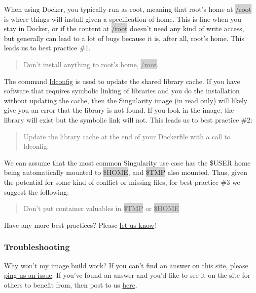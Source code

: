\documentclass[a4paper]{article}
\newcounter{subsubsubsection}[subsubsection]
\begin{document}
	When using Docker, you typically run as root, meaning that root’s home at \colorbox{lightgray}{/root} is where things will install given a specification of home. This is fine when you stay in Docker, or if the content at \colorbox{lightgray}{/root} doesn’t need any kind of write access, but generally can lead to a lot of bugs because it is, after all, root’s home. This leads us to best practice \#1.\\[0.1in]
	\begin{quote}
	Don’t install anything to root’s home, \colorbox{lightgray}{/root}.
	\end{quote}
	
	
	The command \href{https://codeyarns.com/2014/01/14/how-to-add-library-directory-to-ldconfig-cache/}{ldconfig} is used to update the shared library cache. If you have software that requires symbolic linking of libraries and you do the installation without updating the cache, then the Singularity image (in read only) will likely give you an error that the library is not found. If you look in the image, the library will exist but the symbolic link will not. This leads us to best practice \#2:\\[0.1in]
	\begin{quote}
	Update the library cache at the end of your Dockerfile with a call to ldconfig.


	\end{quote}
	
	We can assume that the most common Singularity use case has the \$USER home being automatically mounted to \colorbox{lightgray}{\$HOME}, and \colorbox{lightgray}{\$TMP} also mounted. Thus, given the potential for some kind of conflict or missing files, for best practice \#3 we suggest the following:\\[0.1in]
	\begin{quote}
		Don’t put container valuables in \colorbox{lightgray}{\$TMP} or \colorbox{lightgray}{\$HOME}
	\end{quote}
	Have any more best practices? Please \href{https://www.github.com/singularityware/singularityware.github.io/issues}{let us know}!

\subsubsection{Troubleshooting}

Why won’t my image build work? If you can’t find an answer on this site, please \href{https://www.github.com/singularityware/singularity/issues}{ping us an issue}. If you’ve found an answer and you’d like to see it on the site for others to benefit from, then post to us \href{https://www.github.com/singularityware/singularityware.github.io/issues}{here}.
\end{document}
